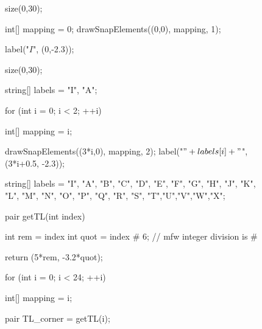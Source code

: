 \documentclass[../gatm_answers.tex]{subfiles}
\begin{document}
\begin{figure}[h]
	\begin{center}
		\begin{minipage}[b]{0.45\textwidth}
			\centering
			\begin{asy}
				size(0,30);
				
				int[] mapping = {0};
				drawSnapElements((0,0), mapping, 1);
				
				label("$I$", (0,-2.3));
			\end{asy}
		\end{minipage}
		\hfill
		\begin{minipage}{0.45\textwidth}
			\centering
			\begin{asy}
				size(0,30);
				
				string[] labels = {"I", "A"};
				
				for (int i = 0; i < 2; ++i) {
				int[] mapping = {i};
				
				drawSnapElements((3*i,0), mapping, 2);
				label("$" + labels[i] + "$", (3*i+0.5, -2.3));
				}
			\end{asy}
		\end{minipage}
	\end{center}
	\vspace*{-2\baselineskip}
	\begin{center}
		\begin{minipage}[t]{0.45\textwidth}
		\end{minipage}
		\hfill
		\begin{minipage}[t]{0.45\textwidth}
		\end{minipage}
	\end{center}

	\begin{center}
		\begin{minipage}[b]{\textwidth}
			\centering
			\begin{asy}[width=0.7\textwidth]
				string[] labels = {"I", "A", "B", "C", "D", "E", "F", "G", "H", "J", "K", "L", "M", "N", "O", "P", "Q", "R", "S", "T","U","V","W","X"};
				
				pair getTL(int index) {
					int rem = index %
					int quot = index # 6; // mfw integer division is #
				
					return (5*rem, -3.2*quot);
				}
				
				for (int i = 0; i < 24; ++i) {
					int[] mapping = {i};
				
					pair TL_corner = getTL(i);
				
}
\end{asy}
\end{minipage}
\end{center}
\end{figure}
\end{document}
